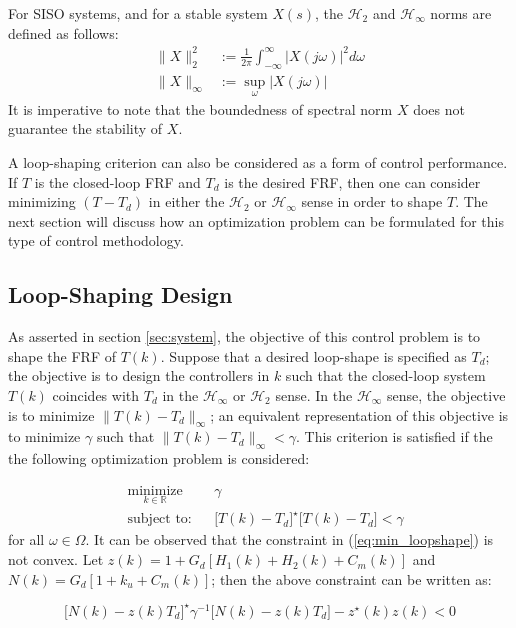 \documentclass[a4paper, 10pt, conference]{ieeeconf}
\begin{document}
For SISO systems, and for a stable system $X(s)$, the $\mathcal{H}_2$ and $\mathcal{H}_\infty$ norms are defined as follows:
\begin{align*}
\| X\|_2^2 & := \frac{1}{2\pi} \int_{- \infty}^\infty |X(j\omega)|^2 d\omega \\
\| X\|_\infty & :=  \sup_{\omega} |X(j\omega)|
\end{align*}
It is imperative to note that the boundedness of spectral norm $X$ does not guarantee the stability of $X$. 

A loop-shaping criterion can also be considered as a form of control performance. If $T$ is the closed-loop FRF and $T_d$ is the desired FRF, then one can consider minimizing $(T-T_d)$ in either the $\mathcal{H}_2$ or $\mathcal{H}_\infty$ sense in order to shape $T$.  The next section will discuss how an optimization problem can be formulated for this type of control methodology.

\subsection{Loop-Shaping Design}
\label{sec:loop_shape}
As asserted in section \ref{sec:system}, the objective of this control problem is to shape the FRF of $T(k)$. Suppose that a desired loop-shape is specified as $T_d$; the objective is to design the controllers in $k$ such that the closed-loop system $T(k)$ coincides with $T_d$ in the $\mathcal{H}_\infty$ or $\mathcal{H}_2$ sense. In the $\mathcal{H}_\infty$ sense, the objective is to minimize $ \|T(k) - T_d \|_\infty$; an equivalent representation of this objective is to minimize $\gamma$ such that $ \|T(k) - T_d \|_\infty < \gamma$. This criterion is satisfied if the the following optimization problem is considered:
 
 \begin{equation} \label{eq:min_loopshape}
\begin{aligned}
& \underset{ k \in \mathbb{R}}{\text{minimize}}
& & \gamma  \\
& \text{subject to:} & & \bigl[T(k)-T_d\bigr]^{\star}\bigl[T(k)-T_d\bigr] < \gamma
\end{aligned}
\end{equation}
for all $\omega \in \Omega$. It can be observed that the constraint in (\ref{eq:min_loopshape}) is not convex. Let $z(k) = 1+G_d[H_1(k)+H_2(k)+C_m(k)]$ and $N(k) = G_d[1+k_u+C_m(k)]$; then the above constraint can be written as:

\begin{equation}
\bigl[N(k)-z(k)T_d \bigr]^{\star}\gamma^{-1} \bigl[N(k)-z(k)T_d \bigr] - z^{\star}(k)z(k)<0
\end{equation} 
\end{document}
